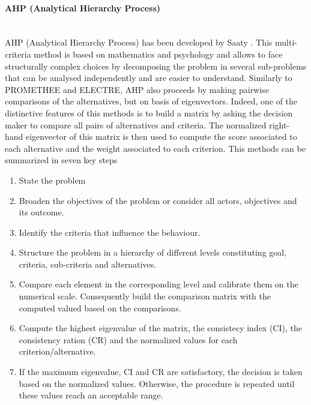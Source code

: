 \paragraph{AHP (Analytical Hierarchy Process)}~\\
AHP (Analytical Hierarchy Process) has been developed by Saaty \cite{MAHP}. This multi-criteria method is based on mathematics and psychology and allows to face structurally complex choices by decomposing the problem in several sub-problems that can be analysed independently and are easier to understand. Similarly to PROMETHEE and ELECTRE, AHP also proceeds by making pairwise comparisons of the alternatives, but on basis of eigenvectors. Indeed, one of the distinctive features of this methods is to build a matrix by asking the decision maker to compare all pairs of alternatives and criteria. The normalized right-hand eigenvector of this matrix is then used to compute the score associated to each alternative and the weight associated to each criterion. This methods can be summarized in seven key steps \cite{Vaidya20061}

\begin{enumerate}
\item State the problem
\item Broaden the objectives of the problem or consider all actors, objectives and its outcome.
\item Identify the criteria that influence the behaviour.
\item Structure the problem in a hierarchy of different levels constituting goal, criteria, sub-criteria and alternatives.
\item Compare each element in the corresponding level and calibrate them on the numerical scale. Consequently build the comparison matrix with the computed valued based on the comparisons.
\item Compute the highest eigenvalue of the matrix, the consistecy index (CI), the consistency ration (CR) and the normalized values for each criterion/alternative.
\item If the maximum eigenvalue, CI and CR are satisfactory, the decision is taken based on the normalized values. Otherwise, the procedure is repeated until these values reach an acceptable range.
\end{enumerate}